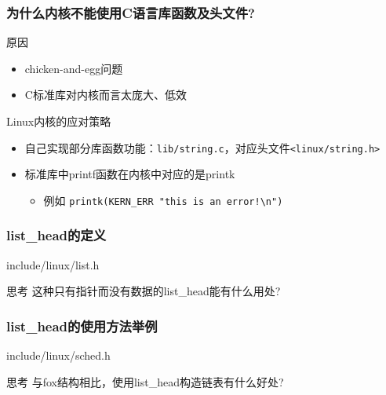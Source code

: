 \documentclass[xcolor=svgnames]{beamer}
\begin{document}
\begin{CJK*}{UTF8}{gbsn}
\begin{frame}[fragile]
\frametitle{为什么内核不能使用C语言库函数及头文件?}
\begin{block}{原因}
\begin{itemize}
\item chicken-and-egg问题
\item C标准库对内核而言太庞大、低效
\end{itemize}
\end{block}
\begin{block}{Linux内核的应对策略}
\begin{itemize}
\item 自己实现部分库函数功能：\verb|lib/string.c|，对应头文件\verb|<linux/string.h>|
\item 标准库中printf函数在内核中对应的是printk
\begin{itemize}
\item 例如 \verb|printk(KERN_ERR "this is an error!\n")|
\end{itemize}
\end{itemize}
\end{block}
\end{frame}

\begin{frame}[fragile]
\frametitle{list\_head的定义}
\begin{block}{include/linux/list.h}
\lstlisthead
\end{block}
\begin{block}{思考}
这种只有指针而没有数据的list\_head能有什么用处?
\end{block}
\end{frame}

\begin{frame}[fragile]
\frametitle{list\_head的使用方法举例}
\begin{block}{include/linux/sched.h}
\lstlistheadusage
\end{block}
\begin{block}{思考}
与fox结构相比，使用list\_head构造链表有什么好处?
\end{block}
\end{frame}


\end{CJK*}
\end{document}

